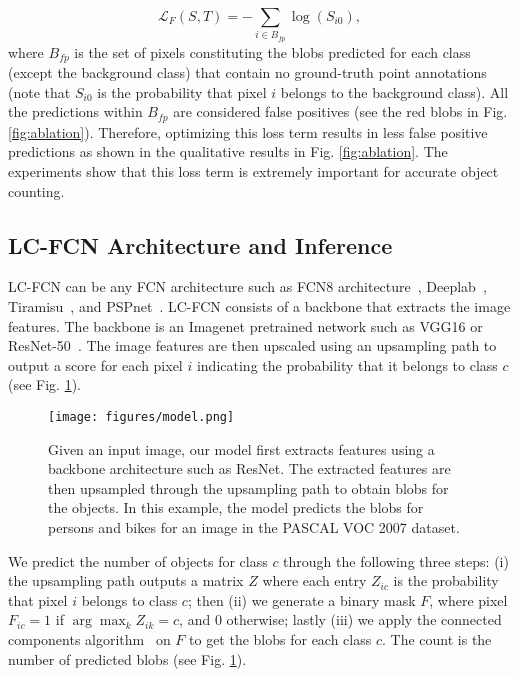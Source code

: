 \documentclass[runningheads]{llncs}
\begin{document}
\begin{equation}
\mathcal{L}_F(S, T) = - \sum_{i \in B_{fp}} \log(S_{i0}),
\label{eq:falsepositive}
\end{equation}
where $B_{fp}$ is the set of pixels constituting the blobs predicted for each class (except the background class) that contain no ground-truth point annotations (note that $S_{i0}$ is the probability that pixel $i$ belongs to the background class). All the predictions within $B_{fp}$ are considered false positives (see the red blobs in Fig. \ref{fig:ablation}). Therefore, optimizing this loss term results in less false positive predictions as shown in the qualitative results in Fig. \ref{fig:ablation}. The experiments show that this loss term is extremely important for accurate object counting.

\subsection{LC-FCN Architecture and Inference}
LC-FCN can be any FCN architecture such as FCN8 architecture~\cite{long2015fully}, Deeplab~\cite{chen2016deeplab}, Tiramisu~\cite{jegou2017one}, and PSPnet~\cite{zhao2017pyramid}. LC-FCN consists of a backbone that extracts the image features. The backbone is an Imagenet pretrained network such as VGG16 or ResNet-50~\cite{simonyan2014very,imagenet_cvpr09}. The image features are then upscaled using an upsampling path to output a score for each pixel $i$ indicating the probability that it belongs to class $c$ (see Fig. \ref{fig:model}). 

\begin{figure}[!t]
\centering
\texttt{[image: figures/model.png]}
\caption{Given an input image, our model first extracts features using a backbone architecture such as ResNet. The extracted features are then upsampled through the upsampling path to obtain blobs for the objects. In this example, the model predicts the blobs for persons and bikes for an image in the PASCAL VOC 2007 dataset.}
\label{fig:model}
\end{figure}

We predict the number of objects for class $c$ through the following three steps: (i) the upsampling path outputs a matrix $Z$ where each entry $Z_{ic}$ is the probability that pixel $i$ belongs to class $c$; then (ii) we generate a binary mask $F$, where pixel $F_{ic}=1$ if $\arg \max_k Z_{ik}=c$, and 0 otherwise; lastly (iii) we apply the connected components algorithm~\cite{wu2005optimizing} on $F$ to get the blobs for each class $c$. The count is the number of predicted blobs (see Fig. \ref{fig:model}).
\end{document}
